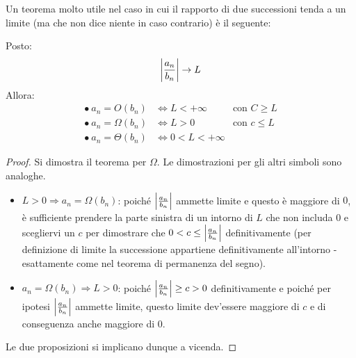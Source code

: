 Un teorema molto utile nel caso in cui il rapporto di due successioni tenda a un limite (ma che non dice niente in caso contrario) è il seguente:
\begin{teor}
	Posto:
	\[
		\left\lvert \frac{a_n}{b_n} \right\rvert\to L
	\]
	Allora:
	\begin{align*}
		\bullet~ a_n=O(b_n)      & \iff L<+\infty   & \text{con }C\geq L \\
		\bullet~ a_n=\Omega(b_n) & \iff L>0         & \text{con }c\leq L \\
		\bullet~ a_n=\Theta(b_n) & \iff 0<L<+\infty &
	\end{align*}
\end{teor}
\begin{proof}
	Si dimostra il teorema per $\Omega$. Le dimostrazioni per gli altri simboli sono analoghe.
	\begin{itemize}
		\item $L>0 \Rightarrow a_n=\Omega(b_n)$: poiché $\left\lvert \frac{a_n}{b_n} \right\rvert$ ammette limite e questo è maggiore di $0$, è sufficiente prendere la parte sinistra di un intorno di $L$ che non includa $0$ e scegliervi un $c$ per dimostrare che $0<c\leq\left\lvert \frac{a_n}{b_n} \right\rvert$ definitivamente (per definizione di limite la successione appartiene definitivamente all'intorno - esattamente come nel teorema di permanenza del segno).
		\item $a_n=\Omega(b_n)\Rightarrow L>0$: poiché $\left\lvert \frac{a_n}{b_n} \right\rvert\geq c>0$ definitivamente e poiché per ipotesi $\left\lvert \frac{a_n}{b_n} \right\rvert$ ammette limite, questo limite dev'essere maggiore di $c$ e di conseguenza anche maggiore di $0$.
	\end{itemize}
	Le due proposizioni si implicano dunque a vicenda.
\end{proof}


